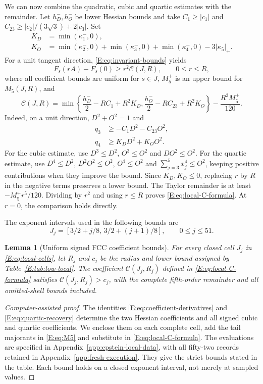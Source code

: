 \documentclass[reqno,english]{amsart}
\newtheorem{lemma}[theorem]{Lemma}
\theoremstyle{definition}
\newtheorem{open problem}[theorem]{Open Problem}
\theoremstyle{remark}
\theoremstyle{plain}
\numberwithin{equation}{section}
\begin{document}
We can now combine the quadratic, cubic and quartic estimates with
the remainder. Let $h_D^-,h_O^-$ be lower Hessian bounds and take
$C_1\ge|c_1|$ and $C_{23}\ge|c_2|/(3\sqrt3)+2|c_3|$.
Set
\begin{align*}
 K_D&=\min(\kappa_1^-,0),\\
 K_O&=\min(\kappa_2^-,0)+\min(\kappa_3^-,0)+\min(\kappa_4^-,0)-3|\kappa_5|_+.
\end{align*}
For a unit tangent direction, \eqref{E:eq:invariant-bounds} yields
\begin{equation}
 F_s(rA)-F_s(0)\ge r^2\mathcal C(J,R),\qquad 0\le r\le R,
 \label{E:eq:local-C}
\end{equation}
where all coefficient bounds are uniform for $s\in J$, $M_5^+$ is an
upper bound for $M_5(J,R)$, and
\begin{equation}
 \mathcal C(J,R)=
 \min\left\{\frac{h_D^-}{2}-RC_1+R^2K_D,
             \frac{h_O^-}{2}-RC_{23}+R^2K_O\right\}
 -\frac{R^3M_5^+}{120}.
 \label{E:eq:local-C-formula}
\end{equation}
Indeed, on a unit direction, $D^2+O^2=1$ and
\[
 \begin{split}
 q_3&\ge-C_1D^2-C_{23}O^2,\\
 q_4&\ge K_DD^2+K_OO^2.
 \end{split}
\]
For the cubic estimate, use $D^3\le D^2$, $O^3\le O^2$ and
$DO^2\le O^2$. For the quartic estimate, use $D^4\le D^2$,
$D^2O^2\le O^2$, $O^4\le O^2$ and
$\sum_{j=3}^5x_j^4\le O^2$, keeping positive contributions when
they improve the bound. Since $K_D,K_O\le0$, replacing $r$ by
$R$ in the negative terms preserves a lower bound.
The Taylor remainder is at least $-M_5^+r^5/120$.
Dividing by $r^2$ and using $r\le R$ proves
\eqref{E:eq:local-C-formula}. At $r=0$, the comparison holds
directly.

The exponent intervals used in the following bounds are
\begin{equation}
 J_j=[3/2+j/8,\,3/2+(j+1)/8],\qquad 0\le j\le51.
 \label{E:eq:local-cells}
\end{equation}
\begin{lemma}[Uniform signed FCC coefficient bounds]
\label{E:lem:signed-inputs}
For every closed cell $J_j$ in \eqref{E:eq:local-cells}, let $R_j$ and
$c_j$ be the radius and lower bound assigned by
Table~\ref{E:tab:low-local}. The coefficient
$\mathcal C(J_j,R_j)$ defined in \eqref{E:eq:local-C-formula} satisfies
$\mathcal C(J_j,R_j)>c_j$, with the complete fifth-order remainder and
all omitted-shell bounds included.
\end{lemma}
\begin{proof}[Computer-assisted proof]
The identities \eqref{E:eq:coefficient-derivatives} and
\eqref{E:eq:quartic-recovery} determine the two Hessian coefficients
and all signed cubic and quartic coefficients. We enclose them on
each complete cell, add the tail majorants in \eqref{E:eq:M5} and
substitute in \eqref{E:eq:local-C-formula}.
The evaluations are specified in
Appendix~\ref{app:epstein-local-data}, with all fifty-two records
retained in Appendix~\ref{app:fresh-execution}. They give the
strict bounds stated in the table. Each bound holds on a closed
exponent interval, not merely at sampled values.
\end{proof}
\end{document}
